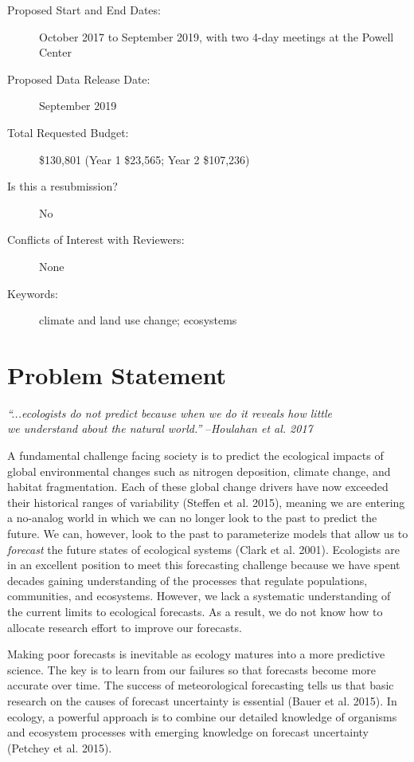 \documentclass[12pt,]{article}
\begin{document}
\begin{description}
\item[Proposed Start and End Dates:] October 2017 to September 2019, with two 4-day meetings at the Powell Center
\item[Proposed Data Release Date:] September 2019
\item[Total Requested Budget:] \$130,801 (Year 1 \$23,565; Year 2 \$107,236)
\item[Is this a resubmission?] No
\item[Conflicts of Interest with Reviewers:] None
\item[Keywords:] climate and land use change; ecosystems
\end{description}

\newpage{}


\section{Problem Statement}

\vspace{-1em} \small{}
\phantom{}\hspace{8em}\textit{``...ecologists do not predict because when we do it reveals how little\\\phantom{}\hspace{8em}we understand about the natural world.''}
--\textit{Houlahan et al. 2017}

\normalsize{} \vspace{0.5em} A fundamental challenge facing society is
to predict the ecological impacts of global environmental changes such
as nitrogen deposition, climate change, and habitat fragmentation. Each
of these global change drivers have now exceeded their historical ranges
of variability (Steffen et al. 2015), meaning we are entering a
no-analog world in which we can no longer look to the past to predict
the future. We can, however, look to the past to parameterize models
that allow us to \emph{forecast} the future states of ecological systems
(Clark et al. 2001). Ecologists are in an excellent position to meet
this forecasting challenge because we have spent decades gaining
understanding of the processes that regulate populations, communities,
and ecosystems. However, we lack a systematic understanding of the
current limits to ecological forecasts. As a result, we do not know how
to allocate research effort to improve our forecasts.

Making poor forecasts is inevitable as ecology matures into a more
predictive science. The key is to learn from our failures so that
forecasts become more accurate over time. The success of meteorological
forecasting tells us that basic research on the causes of forecast
uncertainty is essential (Bauer et al. 2015). In ecology, a powerful
approach is to combine our detailed knowledge of organisms and ecosystem
processes with emerging knowledge on forecast uncertainty (Petchey et
al. 2015).
\end{document}
